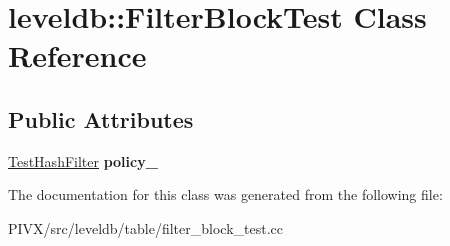 \hypertarget{classleveldb_1_1_filter_block_test}{}\section{leveldb\+:\+:Filter\+Block\+Test Class Reference}
\label{classleveldb_1_1_filter_block_test}
\subsection*{Public Attributes}
\begin{DoxyCompactItemize}
\item 
\mbox{\label{classleveldb_1_1_filter_block_test_ae52fe0fab92f8efc0c078b117cf43e67}} 
\mbox{\hyperlink{classleveldb_1_1_test_hash_filter}{Test\+Hash\+Filter}} {\bfseries policy\+\_\+}
\end{DoxyCompactItemize}


The documentation for this class was generated from the following file\+:\begin{DoxyCompactItemize}
\item 
P\+I\+V\+X/src/leveldb/table/filter\+\_\+block\+\_\+test.\+cc\end{DoxyCompactItemize}
